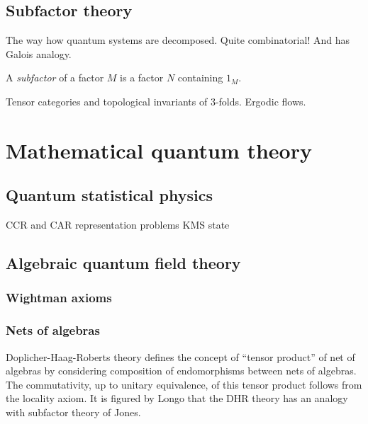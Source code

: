 \documentclass[12pt]{report}
\begin{document}
\begin{prb}

\end{prb}








\chapter{Subfactor theory}
The way how quantum systems are decomposed.
Quite combinatorial!
And has Galois analogy.

\begin{prb}
A \emph{subfactor} of a factor $M$ is a factor $N$ containing $1_M$.
\end{prb}

Tensor categories and topological invariants of 3-folds.
Ergodic flows.







\part{Mathematical quantum theory}

\chapter{Quantum statistical physics}
CCR and CAR representation problems
KMS state




\chapter{Algebraic quantum field theory}
\section{Wightman axioms}
\section{Nets of algebras}
Doplicher-Haag-Roberts theory defines the concept of ``tensor product'' of net of algebras by considering composition of endomorphisms between nets of algebras.
The commutativity, up to unitary equivalence, of this tensor product follows from the locality axiom.
It is figured by Longo that the DHR theory has an analogy with subfactor theory of Jones.
\end{document}
